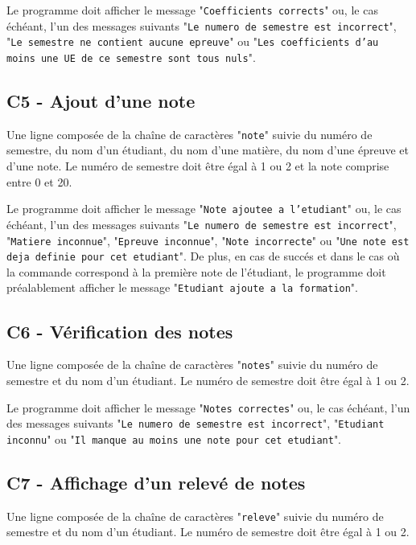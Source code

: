 \documentclass[10pt,a4paper,oneside]{article}
\begin{document}
\medskip

Le programme doit afficher le message "\texttt{Coefficients corrects}" ou, le cas échéant, l'un des messages suivants "\texttt{Le numero de semestre est incorrect}", "\texttt{Le semestre ne contient aucune epreuve}" ou "\texttt{Les coefficients d'au moins une UE de ce semestre sont tous nuls}".

\subsection*{C5 - Ajout d'une note}
Une ligne composée de la chaîne de caractères "\texttt{note}" suivie du numéro de semestre, du nom d'un étudiant, du nom d'une matière, du nom d'une épreuve et d'une note. Le numéro de semestre doit être égal à 1 ou 2 et la note comprise entre 0 et 20.

\medskip

Le programme doit afficher le message "\texttt{Note ajoutee a l'etudiant}" ou, le cas échéant, l'un des messages suivants "\texttt{Le numero de semestre est incorrect}", "\texttt{Matiere inconnue}", "\texttt{Epreuve inconnue}", "\texttt{Note incorrecte}" ou "\texttt{Une note est deja definie pour cet etudiant}". De plus, en cas de succés et dans le cas où la commande correspond à la première note de l'étudiant, le programme doit préalablement afficher le message "\texttt{Etudiant ajoute a la formation}".

\subsection*{C6 - Vérification des notes}
Une ligne composée de la chaîne de caractères "\texttt{notes}" suivie du numéro de semestre et du nom d'un étudiant. Le numéro de semestre doit être égal à 1 ou 2.

\medskip

Le programme doit afficher le message "\texttt{Notes correctes}" ou, le cas échéant, l'un des messages suivants "\texttt{Le numero de semestre est incorrect}", "\texttt{Etudiant inconnu}" ou "\texttt{Il manque au moins une note pour cet etudiant}".

\subsection*{C7 - Affichage d'un relevé de notes}
Une ligne composée de la chaîne de caractères "\texttt{releve}" suivie du numéro de semestre et du nom d'un étudiant. Le numéro de semestre doit être égal à 1 ou 2.
\end{document}
